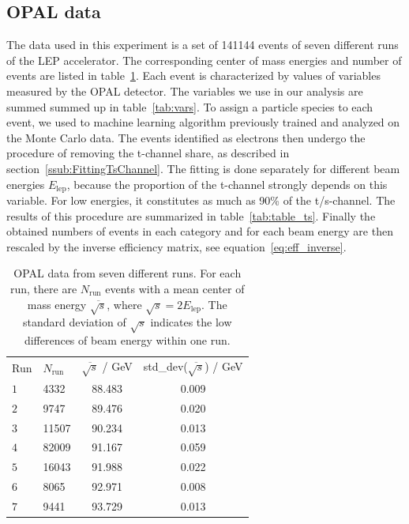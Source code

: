 \subsection{OPAL data}
\label{sub:opal_data}
The data used in this experiment is a set of 141144 events of seven different runs of 
the LEP accelerator. The corresponding center of mass energies and number of events are listed in 
table~\ref{tab:event_data}. Each event is characterized by values of variables measured 
by the OPAL detector. The variables we use in our 
analysis are summed summed up in table~\ref{tab:vars}. To assign a particle species 
to each event, we used to machine learning algorithm previously trained and analyzed 
on the Monte Carlo data. The events identified as electrons then undergo the procedure 
of removing the t-channel share, as described in section~\ref{ssub:FittingTsChannel}.
The fitting is done separately for different beam energies $E_\mathrm{lep}$, because 
the proportion of the t-channel strongly depends on this variable. 
For low energies, it constitutes as much as 90\% of the t/s-channel.
The results of this procedure are summarized in table~\ref{tab:table_ts}.
Finally the obtained numbers of events in each category and for each beam energy 
are then rescaled by the inverse efficiency matrix, see equation~\eqref{eq:eff_inverse}.

\begin{table}[htpb]
    \centering
    \caption{OPAL data from seven different runs. For each run, there are $N_\mathrm{run}$ events with a mean center of mass 
        energy $\overline{\sqrt{s}}$, where $\sqrt{s} = 2 E_\mathrm{lep}$. The standard deviation of 
    $\sqrt{s}$ indicates the low differences of beam energy within one run. }
    \label{tab:event_data}
    \begin{tabular}{l l c c}
        \rowcolor{LightCyan}Run & $N_\mathrm{run}$ & $\overline{\sqrt{s}}$ / GeV & std\_dev($\overline{\sqrt{s}}$) / GeV \\
        \cellcolor{LightCyan}$1$& 4332 & 88.483 & 0.009   \\
        \cellcolor{LightCyan}$2$& 9747 & 89.476 & 0.020   \\
        \cellcolor{LightCyan}$3$& 11507 & 90.234 & 0.013   \\
        \cellcolor{LightCyan}$4$& 82009 & 91.167 & 0.059   \\
        \cellcolor{LightCyan}$5$& 16043 & 91.988 & 0.022   \\
        \cellcolor{LightCyan}$6$& 8065 & 92.971 & 0.008   \\
        \cellcolor{LightCyan}$7$& 9441 & 93.729 & 0.013   \\
    \end{tabular}
\end{table}


